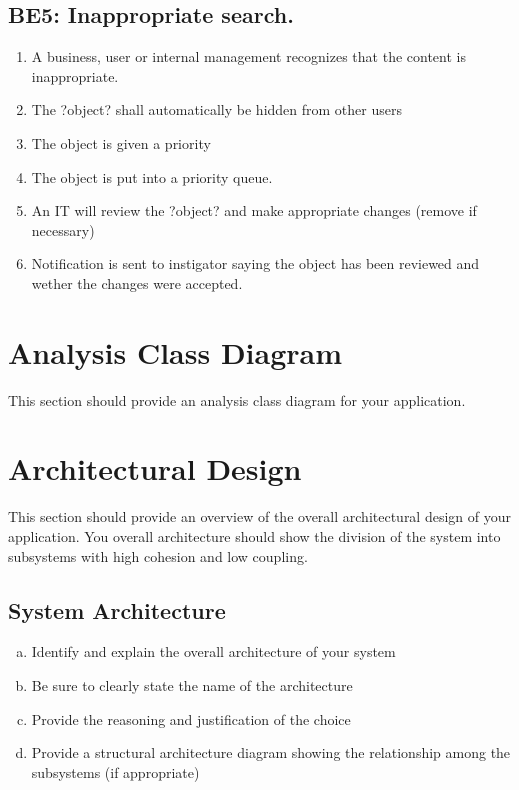 \documentclass[]{article}
\begin{document}
\subsection{BE5: Inappropriate search.}
\label{sub: BE5: Inappropriate search.}
\begin{enumerate}[{BE5}.1]
	\item A business, user or internal management recognizes that the content is inappropriate. 
	\item The ?object? shall automatically be hidden from other users
	\item The object is given a priority
	\item The object is put into a priority queue.
	\item An IT will review the ?object? and make appropriate changes (remove if necessary)
	\item Notification is sent to instigator saying the object has been reviewed and wether the changes were accepted.
\end{enumerate}



\section{Analysis Class Diagram}
\label{sec:analysis_class_diagram}
This section should provide an analysis class diagram for your application.


\section{Architectural Design}
\label{sec:architectural_design}
This section should provide an overview of the overall architectural design of your application. You overall architecture should show the division of the system into subsystems with high cohesion and low coupling.

\subsection{System Architecture}
\label{sub:system_architecture}
\begin{enumerate}[a)]
	\item Identify and explain the overall architecture of your system
	\item Be sure to clearly state the name of the architecture
	\item Provide the reasoning and justification of the choice
	\item Provide a structural architecture diagram showing the relationship among the subsystems (if appropriate)
\end{enumerate}
\end{document}
